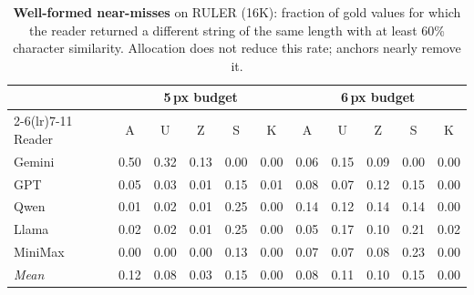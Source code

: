\begin{table}[!htbp]
\centering
\caption{\textbf{Well-formed near-misses} on RULER (16K): fraction of gold values for which the reader returned a different string of the same length with at least 60\% character similarity. Allocation does not reduce this rate; anchors nearly remove it.}
\label{tab:app_silent}
\footnotesize
\setlength{\tabcolsep}{3pt}
\begin{tabular}{l ccccc ccccc}
\toprule
& \multicolumn{5}{c}{5\,px budget} & \multicolumn{5}{c}{6\,px budget} \\
\cmidrule(lr){2-6}\cmidrule(lr){7-11}
Reader & A & U & Z & S & K & A & U & Z & S & K \\
\midrule
Gemini & 0.50 & 0.32 & 0.13 & 0.00 & 0.00 & 0.06 & 0.15 & 0.09 & 0.00 & 0.00 \\
GPT & 0.05 & 0.03 & 0.01 & 0.15 & 0.01 & 0.08 & 0.07 & 0.12 & 0.15 & 0.00 \\
Qwen & 0.01 & 0.02 & 0.01 & 0.25 & 0.00 & 0.14 & 0.12 & 0.14 & 0.14 & 0.00 \\
Llama & 0.02 & 0.02 & 0.01 & 0.25 & 0.00 & 0.05 & 0.17 & 0.10 & 0.21 & 0.02 \\
MiniMax & 0.00 & 0.00 & 0.00 & 0.13 & 0.00 & 0.07 & 0.07 & 0.08 & 0.23 & 0.00 \\
\midrule
\textit{Mean} & 0.12 & 0.08 & 0.03 & 0.15 & 0.00 & 0.08 & 0.11 & 0.10 & 0.15 & 0.00 \\
\bottomrule
\end{tabular}
\end{table}
